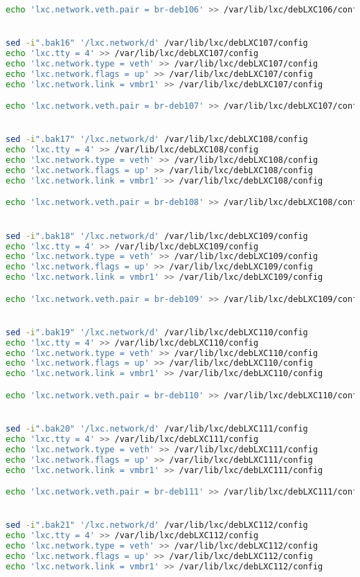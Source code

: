 \documentclass[french]{article}
\begin{document}
\begin{lstlisting}[language=bash,caption={}]
echo 'lxc.network.veth.pair = br-deb106' >> /var/lib/lxc/debLXC106/config


sed -i".bak16" '/lxc.network/d' /var/lib/lxc/debLXC107/config
echo 'lxc.tty = 4' >> /var/lib/lxc/debLXC107/config
echo 'lxc.network.type = veth' >> /var/lib/lxc/debLXC107/config
echo 'lxc.network.flags = up' >> /var/lib/lxc/debLXC107/config
echo 'lxc.network.link = vmbr1' >> /var/lib/lxc/debLXC107/config

echo 'lxc.network.veth.pair = br-deb107' >> /var/lib/lxc/debLXC107/config


sed -i".bak17" '/lxc.network/d' /var/lib/lxc/debLXC108/config
echo 'lxc.tty = 4' >> /var/lib/lxc/debLXC108/config
echo 'lxc.network.type = veth' >> /var/lib/lxc/debLXC108/config
echo 'lxc.network.flags = up' >> /var/lib/lxc/debLXC108/config
echo 'lxc.network.link = vmbr1' >> /var/lib/lxc/debLXC108/config

echo 'lxc.network.veth.pair = br-deb108' >> /var/lib/lxc/debLXC108/config


sed -i".bak18" '/lxc.network/d' /var/lib/lxc/debLXC109/config
echo 'lxc.tty = 4' >> /var/lib/lxc/debLXC109/config
echo 'lxc.network.type = veth' >> /var/lib/lxc/debLXC109/config
echo 'lxc.network.flags = up' >> /var/lib/lxc/debLXC109/config
echo 'lxc.network.link = vmbr1' >> /var/lib/lxc/debLXC109/config

echo 'lxc.network.veth.pair = br-deb109' >> /var/lib/lxc/debLXC109/config


sed -i".bak19" '/lxc.network/d' /var/lib/lxc/debLXC110/config
echo 'lxc.tty = 4' >> /var/lib/lxc/debLXC110/config
echo 'lxc.network.type = veth' >> /var/lib/lxc/debLXC110/config
echo 'lxc.network.flags = up' >> /var/lib/lxc/debLXC110/config
echo 'lxc.network.link = vmbr1' >> /var/lib/lxc/debLXC110/config

echo 'lxc.network.veth.pair = br-deb110' >> /var/lib/lxc/debLXC110/config


sed -i".bak20" '/lxc.network/d' /var/lib/lxc/debLXC111/config
echo 'lxc.tty = 4' >> /var/lib/lxc/debLXC111/config
echo 'lxc.network.type = veth' >> /var/lib/lxc/debLXC111/config
echo 'lxc.network.flags = up' >> /var/lib/lxc/debLXC111/config
echo 'lxc.network.link = vmbr1' >> /var/lib/lxc/debLXC111/config

echo 'lxc.network.veth.pair = br-deb111' >> /var/lib/lxc/debLXC111/config


sed -i".bak21" '/lxc.network/d' /var/lib/lxc/debLXC112/config
echo 'lxc.tty = 4' >> /var/lib/lxc/debLXC112/config
echo 'lxc.network.type = veth' >> /var/lib/lxc/debLXC112/config
echo 'lxc.network.flags = up' >> /var/lib/lxc/debLXC112/config
echo 'lxc.network.link = vmbr1' >> /var/lib/lxc/debLXC112/config


\end{lstlisting}
\end{document}
